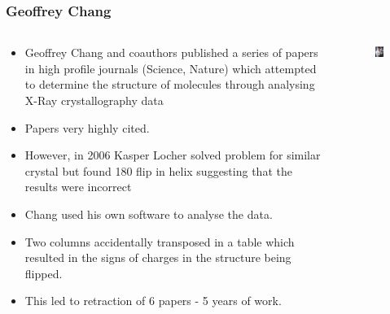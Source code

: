 \documentclass{beamer}
\begin{document}
\begin{frame}
\frametitle{Geoffrey Chang}

\begin{columns}
\begin{column}{0.7\textwidth}
\begin{itemize}
\item Geoffrey Chang and coauthors published a series of papers in high profile journals (Science, Nature) which attempted
to determine the structure of molecules through analysing X-Ray crystallography data 
\item Papers very highly cited.
\item However, in 2006 Kasper Locher solved problem for similar crystal but found 180 flip in helix suggesting that the results were incorrect
\item Chang used his own software to analyse the data.
\item Two columns accidentally transposed in a table which resulted in the signs of charges in the structure being flipped.
\item This led to retraction of 6 papers - 5 years of work.
\end{itemize}
\end{column}

\begin{column}{0.3\textwidth}
    \begin{figure}
        \includegraphics[width=0.95\columnwidth]{images/chang_jeff.jpg}
    \end{figure}
\end{column}
\end{columns}
\end{frame}
\end{document}
